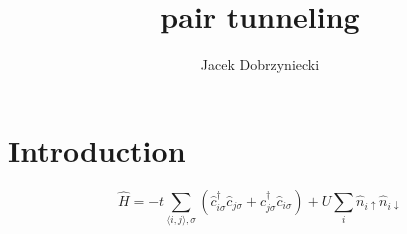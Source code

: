 \documentclass[aps,floatfix,showpacs,pra]{revtex4}
\begin{document}
\title{pair tunneling}
\author{Jacek Dobrzyniecki}

\begin{abstract}
\end{abstract}

\maketitle
\section{Introduction}


\begin{equation}
 \hat{H} = -t \sum\limits_{\langle i,j \rangle, \sigma} (\hat{c}^\dagger_{i \sigma} \hat{c}_{j \sigma} + \hat{c}^\dagger_{j \sigma} \hat{c}_{i \sigma}) + U \sum\limits_i \hat{n}_{i \uparrow} \hat{n}_{i \downarrow}
\end{equation}
\end{document}

